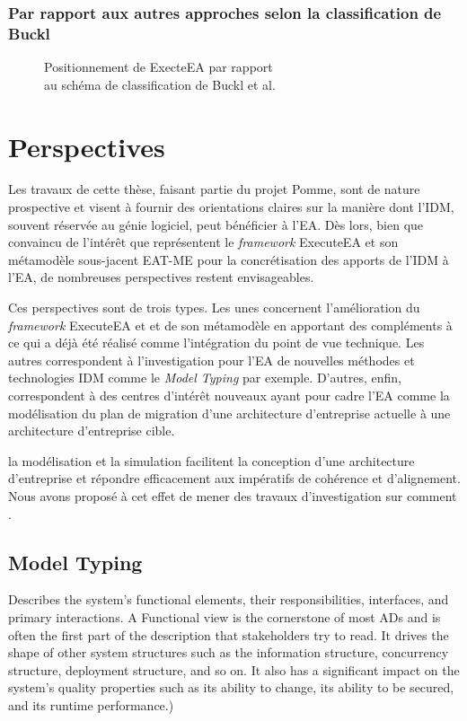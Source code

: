             \subsubsection{Par rapport aux autres approches selon la classification de Buckl}

\begin{figure}[!ht]
	
	\caption{Positionnement de ExecteEA par rapport\\au schéma de classification de
	Buckl et al. \protect\cite{buckl2009classifying}}
	\label{fig:positionBuckl}
\end{figure}

\section{Perspectives}

Les travaux de cette thèse, faisant partie du projet Pomme, sont de nature prospective et visent à fournir 
des orientations claires sur la manière dont l'IDM, souvent réservée au génie logiciel, peut bénéficier à l'EA.
Dès lors, bien que convaincu de l'intérêt que représentent le \emph{framework} ExecuteEA et son métamodèle sous-jacent
EAT-ME pour la concrétisation des apports de l'IDM à l'EA, de nombreuses perspectives restent envisageables.

Ces perspectives sont de trois types. Les unes concernent l'amélioration du \emph{framework} ExecuteEA et 
et de son métamodèle en apportant des compléments à ce qui a déjà été réalisé comme l'intégration
du point de vue technique. Les autres correspondent à l'investigation pour l'EA
de nouvelles méthodes et technologies IDM comme le \emph{Model Typing} par exemple. D'autres, enfin,
correspondent à des centres d'intérêt nouveaux ayant pour cadre l'EA comme la modélisation du plan de migration
d'une architecture d'entreprise actuelle à une architecture d'entreprise cible.

la modélisation et la simulation facilitent la conception d'une architecture d'entreprise
et répondre efficacement aux impératifs de cohérence et d'alignement. Nous avons proposé à cet effet
de mener des travaux d'investigation sur comment .


    \subsection{Model Typing}

 Describes the system’s functional elements, their responsibilities,
interfaces, and primary interactions. A Functional view is the cornerstone of
most ADs and is often the first part of the description that stakeholders try
to read. It drives the shape of other system structures such as the information
structure, concurrency structure, deployment structure, and so on. It also has a 
significant impact on the system’s quality properties such as its ability to
change, its ability to be secured, and its runtime performance.) 

